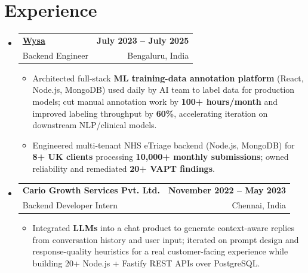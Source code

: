 \documentclass[letterpaper,10pt]{article}
\makeatletter
\newcommand{\resumeItem}[1]{
  \item\small{#1\vspace{-1pt}}
}
\newcommand{\resumeSubheading}[4]{
  \vspace{1pt}\item
    \begin{tabular*}{0.985\textwidth}[t]{l@{\extracolsep{\fill}}r}
      \textbf{#1} & \textbf{\small #2} \\
      {\small\color{ResumeSlate} #3} & {\small\color{ResumeSlate} #4} \\
    \end{tabular*}\vspace{-6pt}
}
\newcommand{\resumeSubHeadingListStart}{\begin{itemize}[leftmargin=0.0in, label={}, itemsep=2pt, topsep=2pt]}
\newcommand{\resumeSubHeadingListEnd}{\end{itemize}}
\newcommand{\resumeItemListStart}{\begin{itemize}[leftmargin=0.18in, itemsep=2pt, topsep=1pt]}
\newcommand{\resumeItemListEnd}{\end{itemize}\vspace{-4pt}}
\makeatother
\begin{document}
\section{Experience}
\resumeSubHeadingListStart
  \resumeSubheading
    {\href{https://www.wysa.io}{Wysa}}{July 2023 -- July 2025}
    {Backend Engineer}{Bengaluru, India}
    \resumeItemListStart
      \resumeItem{Architected full-stack \textbf{ML training-data annotation platform} (React, Node.js, MongoDB) used daily by AI team to label data for production models; cut manual annotation work by \textbf{100+ hours/month} and improved labeling throughput by \textbf{60\%}, accelerating iteration on downstream NLP/clinical models.}
      \resumeItem{Engineered multi-tenant NHS eTriage backend (Node.js, MongoDB) for \textbf{8+ UK clients} processing \textbf{10{,}000+ monthly submissions}; owned reliability and remediated \textbf{20+ VAPT findings}.}
    \resumeItemListEnd
  \resumeSubheading
    {Cario Growth Services Pvt. Ltd.}{November 2022 -- May 2023}
    {Backend Developer Intern}{Chennai, India}
    \resumeItemListStart
      \resumeItem{Integrated \textbf{LLMs} into a chat product to generate context-aware replies from conversation history and user input; iterated on prompt design and response-quality heuristics for a real customer-facing experience while building 20+ Node.js + Fastify REST APIs over PostgreSQL.}
    \resumeItemListEnd
\resumeSubHeadingListEnd
\vspace{-4pt}
\end{document}
